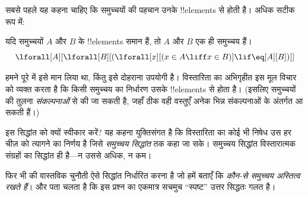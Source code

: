 \documentclass[../../../include/open-logic-section]{subfiles}
\begin{document}

सबसे पहले यह कहना चाहिए कि समुच्चयों की पहचान उनके !!{element}s से होती है।
अधिक सटीक रूप में:

\begin{axiom}[विस्तारिता]
यदि समुच्चयों $A$ और $B$ के !!{element}s समान हैं, तो $A$ और $B$ एक ही
समुच्चय हैं।
\[
  \lforall[A][\lforall[B][(\lforall[x][(x \in A \liff x \in B)] \lif
  \eq[A][B])]]
\]
\end{axiom}

हमने पूरे  में इसे मान लिया था, किंतु इसे दोहराना
उपयोगी है। विस्तारिता का अभिगृहीत इस मूल विचार को व्यक्त करता है कि किसी
समुच्चय का निर्धारण उसके !!{element}s से होता है। (इसलिए समुच्चयों की तुलना
\emph{संकल्पनाओं} से की जा सकती है, जहाँ ठीक वही वस्तुएँ अनेक भिन्न
संकल्पनाओं के अंतर्गत आ सकती हैं।)

इस सिद्धांत को क्यों स्वीकार करें? यह कहना युक्तिसंगत है कि विस्तारिता का
कोई भी निषेध उस हर चीज़ को त्यागने का निर्णय है जिसे \emph{समुच्चय सिद्धांत}
तक कहा जा सके। समुच्चय सिद्धांत विस्तारात्मक संग्रहों का सिद्धांत ही है---न
उससे अधिक, न कम।

फिर भी  की वास्तविक चुनौती ऐसे सिद्धांत निर्धारित
करना है जो हमें बताएँ कि \emph{कौन-से समुच्चय अस्तित्व रखते हैं}। और पता
चलता है कि इस प्रश्न का एकमात्र सचमुच ``स्पष्ट'' उत्तर सिद्धतः गलत है।
\end{document}
